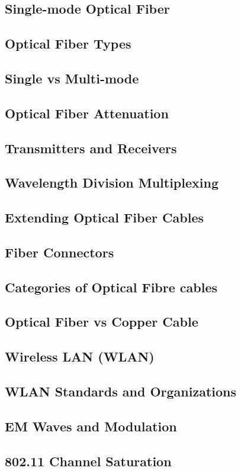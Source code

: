 \documentclass[11pt]{article}
\begin{document}
\subsection{Single-mode Optical Fiber}
\subsection{Optical Fiber Types}
\subsection{Single vs Multi-mode}
\subsection{Optical Fiber Attenuation}
\subsection{Transmitters and Receivers}
\subsection{Wavelength Division Multiplexing}
\subsection{Extending Optical Fiber Cables}
\subsection{Fiber Connectors}
\subsection{Categories of Optical Fibre cables}
\subsection{Optical Fiber vs Copper Cable}
\subsection{Wireless LAN (WLAN)}
\subsection{WLAN Standards and Organizations}
\subsection{EM Waves and Modulation}
\subsection{802.11 Channel Saturation}
\end{document}
